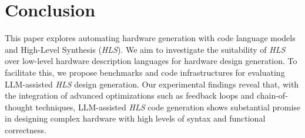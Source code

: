 \section{Conclusion}
This paper explores automating hardware generation with code language models and  High-Level Synthesis (\textit{HLS}).
We aim to investigate the suitability of \textit{HLS} over low-level hardware
description languages for hardware design generation.
To facilitate this, we propose benchmarks and code infrastructures for evaluating LLM-assisted \textit{HLS} design generation.
Our experimental findings reveal that, with the integration of advanced optimizations such as feedback loops and chain-of-thought techniques, 
LLM-assisted \textit{HLS} code generation shows substantial promise in designing complex hardware with high levels of
syntax and functional correctness.
\newpage